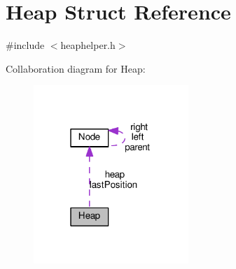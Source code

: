 \hypertarget{structHeap}{}\section{Heap Struct Reference}
\label{structHeap}


{\ttfamily \#include $<$heaphelper.\+h$>$}



Collaboration diagram for Heap\+:\nopagebreak
\begin{figure}[H]
\begin{center}
\leavevmode
\includegraphics[width=166pt]{structHeap__coll__graph}
\end{center}
\end{figure}
